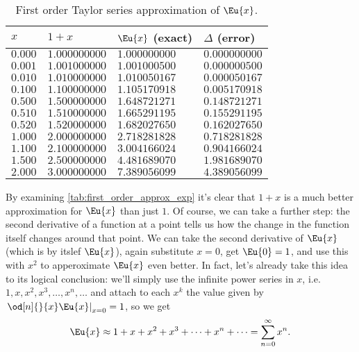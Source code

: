 \begin{table}
  \caption{First order Taylor series approximation of $\Eu{x}$.}
  \label{tab:first_order_approx_exp}
  \begin{center}
    {
      \renewcommand{\arraystretch}{1.2}
      \begin{tabular}[c]{llll}
        \toprule
        $x$ & $1+x$ & $\Eu{x}$ (exact) & $\Delta$ (error) \\
        \midrule
        $0.000$ & $1.000000000$ & $1.000000000$ & $0.000000000$\\
        $0.001$ & $1.001000000$ & $1.001000500$ & $0.000000500$\\
        $0.010$ & $1.010000000$ & $1.010050167$ & $0.000050167$\\
        $0.100$ & $1.100000000$ & $1.105170918$ & $0.005170918$\\
        $0.500$ & $1.500000000$ & $1.648721271$ & $0.148721271$\\
        $0.510$ & $1.510000000$ & $1.665291195$ & $0.155291195$\\
        $0.520$ & $1.520000000$ & $1.682027650$ & $0.162027650$\\
        $1.000$ & $2.000000000$ & $2.718281828$ & $0.718281828$\\
        $1.100$ & $2.100000000$ & $3.004166024$ & $0.904166024$\\
        $1.500$ & $2.500000000$ & $4.481689070$ & $1.981689070$\\
        $2.000$ & $3.000000000$ & $7.389056099$ & $4.389056099$\\
        \bottomrule
      \end{tabular}
    }
  \end{center}
\end{table}

By examining \autoref{tab:first_order_approx_exp} it's clear that $1+x$ is a much better approximation for $\Eu{x}$ than just $1$. Of course, we can take a further step: the second derivative of a function at a point tells us how the change in the function itself changes around that point. We can take the second derivative of $\Eu{x}$ (which is by itslef $\Eu{x}$), again substitute $x=0$, get $\Eu{0}=1$, and use this with $x^{2}$ to apperoximate $\Eu{x}$ even better. In fact, let's already take this idea to its logical conclusion: we'll simply use the infinite power series in $x$, i.e. $1,x,x^{2},x^{3},\dots,x^{n},\dots$ and attach to each $x^{k}$ the value given by $\left.\od[n]{}{x}\Eu{x}\right|_{x=0}=1$, so we get
\begin{equation}
  \Eu{x} \approx 1+x+x^{2}+x^{3}+\dots+x^{n}+\dots = \sum\limits_{n=0}^{\infty}x^{n}.
  \label{eq:exp_series_expansion}
\end{equation}

